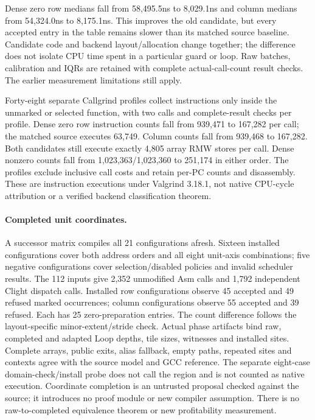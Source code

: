 Dense zero row medians fall from 58,495.5ns to 8,029.1ns and column medians
from 54,324.0ns to 8,175.1ns. This improves the old candidate, but every
accepted entry in the table remains slower than its matched source baseline.
Candidate code and backend layout/allocation change together; the difference
does not isolate CPU time spent in a particular guard or loop. Raw batches,
calibration and IQRs are retained with complete actual-call-count result checks.
The earlier measurement limitations still apply.

Forty-eight separate Callgrind profiles collect instructions only inside the
unmarked or selected function, with two calls and complete-result checks per
profile. Dense zero row instruction counts fall from 939,471 to 167,282 per
call; the matched source executes 63,749. Column counts fall from 939,468 to
167,282. Both candidates still execute exactly 4,805 array RMW stores per
call. Dense nonzero counts fall from 1,023,363/1,023,360 to 251,174 in either
order. The profiles exclude inclusive call costs and retain per-PC counts and
disassembly. These are instruction executions under Valgrind 3.18.1, not
native CPU-cycle attribution or a verified backend classification theorem.

\paragraph{Completed unit coordinates.}
A successor matrix compiles all 21 configurations afresh. Sixteen installed
configurations cover both address orders and all eight unit-axis combinations;
five negative configurations cover selection/disabled policies and invalid
scheduler results. The 112 inputs give 2,352 unmodified Asm calls and 1,792
independent Clight dispatch calls. Installed row configurations observe 45
accepted and 49 refused marked occurrences; column configurations observe
55 accepted and 39 refused. Each has 25 zero-preparation entries. The count
difference follows the layout-specific minor-extent/stride check.
Actual phase artifacts bind raw, completed and adapted Loop depths, tile sizes,
witnesses and installed sites. Complete arrays, public exits, alias fallback,
empty paths, repeated sites and contexts agree with the source model and GCC
reference. The separate eight-case domain-check/install probe does not call
the region and is not counted as native execution. Coordinate completion is
an untrusted proposal checked against the source; it introduces no proof module
or new compiler assumption. There is no raw-to-completed equivalence theorem
or new profitability measurement.

